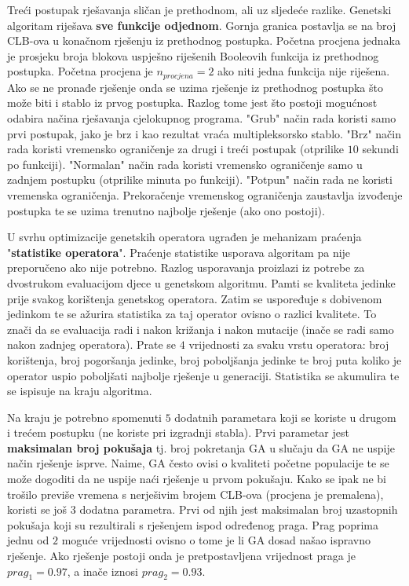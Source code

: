 \documentclass[times, utf8, diplomski]{fer}
\begin{document}
Treći postupak rješavanja sličan je prethodnom, ali uz sljedeće razlike. Genetski algoritam riješava \textbf{sve funkcije odjednom}. Gornja granica postavlja se na broj CLB-ova u konačnom rješenju iz prethodnog postupka. Početna procjena jednaka je prosjeku broja blokova uspješno riješenih Booleovih funkcija iz prethodnog postupka. Početna procjena je $n_{procjena}=2$ ako niti jedna funkcija nije riješena. Ako se ne pronađe rješenje onda se uzima rješenje iz prethodnog postupka što može biti i stablo iz prvog postupka. Razlog tome jest što postoji mogućnost odabira načina rješavanja cjelokupnog programa. "Grub" način rada koristi samo prvi postupak, jako je brz i kao rezultat vraća multipleksorsko stablo. "Brz" način rada koristi vremensko ograničenje za drugi i treći postupak (otprilike $10$ sekundi po funkciji). "Normalan" način rada koristi vremensko ograničenje samo u zadnjem postupku (otprilike minuta po funkciji). "Potpun" način rada ne koristi vremenska ograničenja. Prekoračenje vremenskog ograničenja zaustavlja izvođenje postupka te se uzima trenutno najbolje rješenje (ako ono postoji). 

U svrhu optimizacije genetskih operatora ugrađen je mehanizam praćenja "\textbf{statistike operatora}". Praćenje statistike usporava algoritam pa nije preporučeno ako nije potrebno. Razlog usporavanja proizlazi iz potrebe za dvostrukom evaluacijom djece u genetskom algoritmu. Pamti se kvaliteta jedinke prije svakog korištenja genetskog operatora. Zatim se uspoređuje s dobivenom jedinkom te se ažurira statistika za taj operator ovisno o razlici kvalitete. To znači da se evaluacija radi i nakon križanja i nakon mutacije (inače se radi samo nakon zadnjeg operatora). Prate se $4$ vrijednosti za svaku vrstu operatora: broj korištenja, broj pogoršanja jedinke, broj poboljšanja jedinke te broj puta koliko je operator uspio poboljšati najbolje rješenje u generaciji. Statistika se akumulira te se ispisuje na kraju algoritma.

Na kraju je potrebno spomenuti $5$ dodatnih parametara koji se koriste u drugom i trećem postupku (ne koriste pri izgradnji stabla). Prvi parametar jest \textbf{maksimalan broj pokušaja} tj. broj pokretanja GA u slučaju da GA ne uspije način rješenje isprve. Naime, GA često ovisi o kvaliteti početne populacije te se može dogoditi da ne uspije naći rješenje u prvom pokušaju. Kako se ipak ne bi trošilo previše vremena s nerješivim brojem CLB-ova (procjena je premalena), koristi se još $3$ dodatna parametra. Prvi od njih jest maksimalan broj uzastopnih pokušaja koji su rezultirali s rješenjem ispod određenog praga. Prag poprima jednu od $2$ moguće vrijednosti ovisno o tome je li GA dosad našao ispravno rješenje. Ako rješenje postoji onda je pretpostavljena vrijednost praga je $prag_{1}=0.97$, a inače iznosi $prag_{2}=0.93$.
\end{document}
